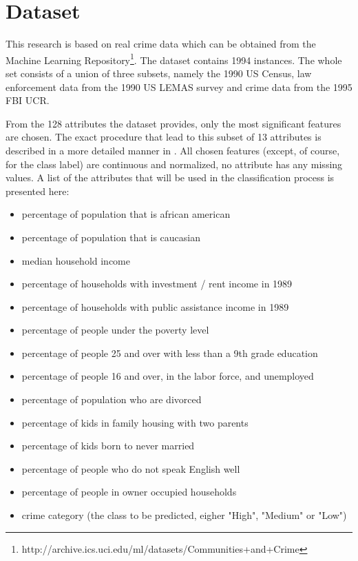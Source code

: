 \section{Dataset}

This research is based on real crime data which can be obtained from the Machine Learning
Repository\footnote{http://archive.ics.uci.edu/ml/datasets/Communities+and+Crime}. The
dataset contains 1994 instances. The whole set consists of a union of
three subsets, namely the 1990 US Census, law enforcement data from
the 1990 US LEMAS survey and crime data from the 1995 FBI UCR.

From the 128 attributes the dataset provides, only the most
significant features are chosen.
The exact procedure that lead to this subset of 13 attributes
is described in a more detailed manner in .
All chosen features (except, of course, for the class label)
are continuous and normalized, no attribute has any missing
values.
A list of the attributes that will be used in the classification process is
presented here:
\begin{itemize}
  \setlength{\itemsep}{-2pt}
  \item percentage of population that is african american
  \item percentage of population that is caucasian
  \item median household income
  \item percentage of households with investment / rent income in 1989
  \item percentage of households with public assistance income in 1989
  \item percentage of people under the poverty level
  \item percentage of people 25 and over with less than a 9th grade education
  \item percentage of people 16 and over, in the labor force, and unemployed
  \item percentage of population who are divorced
  \item percentage of kids in family housing with two parents
  \item percentage of kids born to never married
  \item percentage of people who do not speak English well
  \item percentage of people in owner occupied households
  \item crime category (the class to be predicted, eigher "High", "Medium" or "Low")
\end{itemize}

